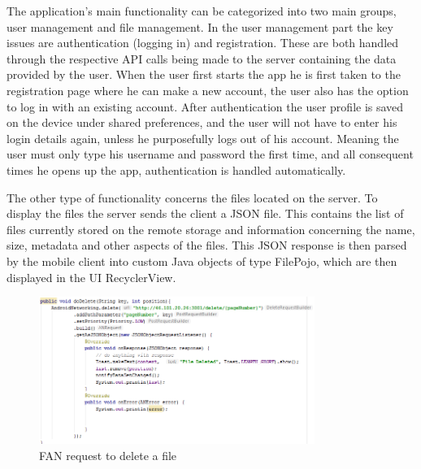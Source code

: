 \documentclass[11pt]{article}
\begin{document}
The application’s main functionality can be categorized into two main groups, user management and file management. In the user management part the key issues are authentication (logging in) and registration. These are both handled through the respective API calls being made to the server containing the data provided by the user. When the user first starts the app he is first taken to the registration page where he can make a new account, the user also has the option to log in with an existing account. After authentication the user profile is saved on the device under shared preferences, and the user will not have to enter his login details again, unless he purposefully logs out of his account. Meaning the user must only type his username and password the first time, and all consequent times he opens up the app, authentication is handled automatically.


The other type of functionality concerns the files located on the server. To display the files the server sends the client a JSON file. This contains the list of files currently stored on the remote storage and information concerning the name, size, metadata and other aspects of the files. This JSON response is then parsed by the mobile client into custom Java objects of type FilePojo, which are then displayed in the UI RecyclerView. 

\begin{figure} [H]
\caption{FAN request to delete a file}
\centering
\includegraphics[width=0.8\textwidth]{delete.PNG}
\end{figure}
\end{document}

